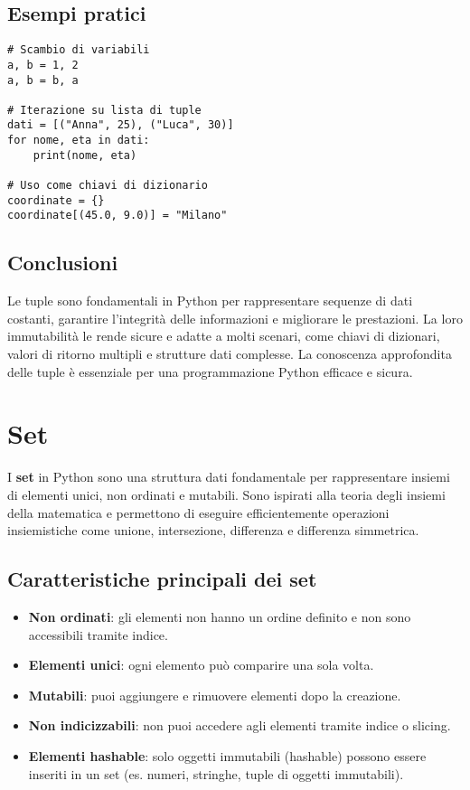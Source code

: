 \documentclass[a4paper,12pt]{article}
\begin{document}
\subsection*{Esempi pratici}
\begin{lstlisting}
# Scambio di variabili
a, b = 1, 2
a, b = b, a

# Iterazione su lista di tuple
dati = [("Anna", 25), ("Luca", 30)]
for nome, eta in dati:
    print(nome, eta)

# Uso come chiavi di dizionario
coordinate = {}
coordinate[(45.0, 9.0)] = "Milano"
\end{lstlisting}

\subsection*{Conclusioni}
Le tuple sono fondamentali in Python per rappresentare sequenze di dati costanti, garantire l'integrità delle informazioni e migliorare le prestazioni. La loro immutabilità le rende sicure e adatte a molti scenari, come chiavi di dizionari, valori di ritorno multipli e strutture dati complesse. La conoscenza approfondita delle tuple è essenziale per una programmazione Python efficace e sicura.

\section{Set}
I \textbf{set} in Python sono una struttura dati fondamentale per rappresentare insiemi di elementi unici, non ordinati e mutabili. Sono ispirati alla teoria degli insiemi della matematica e permettono di eseguire efficientemente operazioni insiemistiche come unione, intersezione, differenza e differenza simmetrica.

\subsection*{Caratteristiche principali dei set}
\begin{itemize}
    \item \textbf{Non ordinati}: gli elementi non hanno un ordine definito e non sono accessibili tramite indice.
    \item \textbf{Elementi unici}: ogni elemento può comparire una sola volta.
    \item \textbf{Mutabili}: puoi aggiungere e rimuovere elementi dopo la creazione.
    \item \textbf{Non indicizzabili}: non puoi accedere agli elementi tramite indice o slicing.
    \item \textbf{Elementi hashable}: solo oggetti immutabili (hashable) possono essere inseriti in un set (es. numeri, stringhe, tuple di oggetti immutabili).
\end{itemize}
\end{document}
